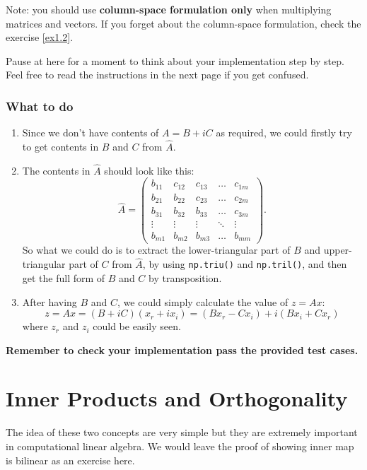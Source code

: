 \noindent Note: you should use \textbf{column-space formulation only} when multiplying matrices and vectors. If you forget about the column-space formulation, check the exercise \ref{ex1.2}.\medskip

\noindent 
Pause at here for a moment to think about your implementation step by step. Feel free to read the instructions in the next page if you get confused.
\newpage
\subsubsection*{What to do}
\begin{enumerate}
\item Since we don't have contents of $A = B + iC$ as required, we could firstly try to get contents in $B$ and $C$ from $\hat{A}$.
\item The contents in $\hat{A}$ should look like this:
  \[
    \hat{A} = \begin{pmatrix} 
      b_{11} & c_{12} & c_{13} & \ldots & c_{1m} \\
      b_{21} & b_{22} & c_{23} & \ldots & c_{2m} \\
      b_{31} & b_{32} & b_{33} & \ldots & c_{3m} \\
      \vdots & \vdots & \vdots & \ddots & \vdots \\ 
      b_{m1} & b_{m2} & b_{m3} & \ldots & b_{mm}
    \end{pmatrix} 
  .\]
  So what we could do is to extract the lower-triangular part of $B$ and upper-triangular part of $C$ from $\hat{A}$, by using \texttt{np.triu()} and \texttt{np.tril()}, and then get the full form of $B$ and  $C$ by transposition.
 \item After having $B$ and $C$, we could simply calculate the value of  $z = Ax$:
    \[
      z = Ax = (B + iC)(x_r + ix_i) = (Bx_r - Cx_i) + i(Bx_i + Cx_r)
   \]
   where $z_r$ and $z_i$ could be easily seen.
\end{enumerate}
\textbf{Remember to check your implementation pass the provided test cases.}

\section{Inner Products and Orthogonality}%
The idea of these two concepts are very simple but they are extremely important in computational linear algebra. We would leave the proof of showing inner map is bilinear as an exercise here.
\newpage
